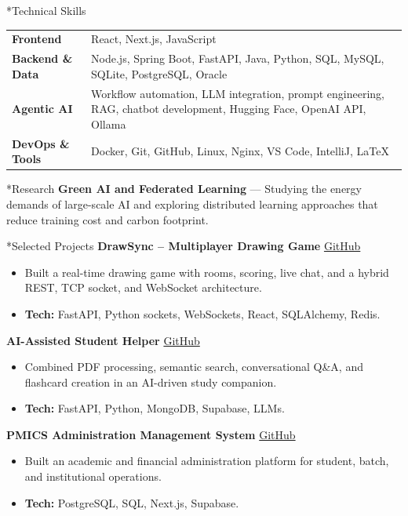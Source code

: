 \documentclass[10pt,a4paper]{article}
\makeatletter
\renewcommand\section{\@startsection{section}{1}{0pt}{8pt}{3pt}{\large\bfseries\color{deepblue}}}
\makeatother
\begin{document}
\section*{Technical Skills}
\begin{tabularx}{\textwidth}{@{}>{\bfseries}l X@{}}
Frontend & React, Next.js, JavaScript \\
Backend \& Data & Node.js, Spring Boot, FastAPI, Java, Python, SQL, MySQL, SQLite, PostgreSQL, Oracle \\
Agentic AI & Workflow automation, LLM integration, prompt engineering, RAG, chatbot development, Hugging Face, OpenAI API, Ollama \\
DevOps \& Tools & Docker, Git, GitHub, Linux, Nginx, VS Code, IntelliJ, LaTeX
\end{tabularx}

\section*{Research}
\textbf{Green AI and Federated Learning} --- Studying the energy demands of large-scale AI and exploring distributed learning approaches that reduce training cost and carbon footprint.

\section*{Selected Projects}
\textbf{DrawSync -- Multiplayer Drawing Game} \hfill \href{https://github.com/Walid2851/DrawSync}{GitHub}
\begin{itemize}
  \item Built a real-time drawing game with rooms, scoring, live chat, and a hybrid REST, TCP socket, and WebSocket architecture.
  \item \textbf{Tech:} FastAPI, Python sockets, WebSockets, React, SQLAlchemy, Redis.
\end{itemize}

\textbf{AI-Assisted Student Helper} \hfill \href{https://github.com/fayek2025/AI-Assisted-Student-Helper}{GitHub}
\begin{itemize}
  \item Combined PDF processing, semantic search, conversational Q\&A, and flashcard creation in an AI-driven study companion.
  \item \textbf{Tech:} FastAPI, Python, MongoDB, Supabase, LLMs.
\end{itemize}

\textbf{PMICS Administration Management System} \hfill \href{https://github.com/Flamy-A/FinMan}{GitHub}
\begin{itemize}
  \item Built an academic and financial administration platform for student, batch, and institutional operations.
  \item \textbf{Tech:} PostgreSQL, SQL, Next.js, Supabase.
\end{itemize}
\end{document}
